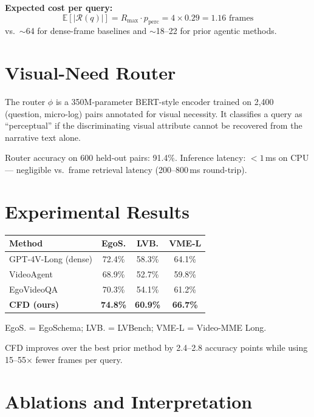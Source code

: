 \documentclass[10pt,twocolumn]{article}
\begin{document}
\textbf{Expected cost per query:}
\[
  \mathbb{E}[|\mathcal{R}(q)|] = R_{\max} \cdot p_{\mathrm{perc}}
  = 4 \times 0.29 = 1.16 \text{ frames}
\]
vs.\ $\sim$64 for dense-frame baselines and $\sim$18--22 for prior
agentic methods.

\section{Visual-Need Router}

The router $\phi$ is a 350M-parameter BERT-style encoder trained on
2,400 (question, micro-log) pairs annotated for visual necessity. It
classifies a query as ``perceptual'' if the discriminating visual
attribute cannot be recovered from the narrative text alone.

Router accuracy on 600 held-out pairs: 91.4\%. Inference latency:
${<}1$\,ms on CPU --- negligible vs.\ frame retrieval latency
(200--800\,ms round-trip).

\section{Experimental Results}

\begin{center}
\begin{tabular}{lccc}
\toprule
Method & EgoS. & LVB. & VME-L \\
\midrule
GPT-4V-Long (dense)  & 72.4\% & 58.3\% & 64.1\% \\
VideoAgent           & 68.9\% & 52.7\% & 59.8\% \\
EgoVideoQA           & 70.3\% & 54.1\% & 61.2\% \\
\textbf{CFD (ours)}  & \textbf{74.8\%} & \textbf{60.9\%} & \textbf{66.7\%} \\
\bottomrule
\end{tabular}
\end{center}

\vspace{2pt}
{\small EgoS. = EgoSchema; LVB. = LVBench; VME-L = Video-MME Long.}
\vspace{4pt}

CFD improves over the best prior method by 2.4--2.8 accuracy points
while using 15--55$\times$ fewer frames per query.

\section{Ablations and Interpretation}
\end{document}
